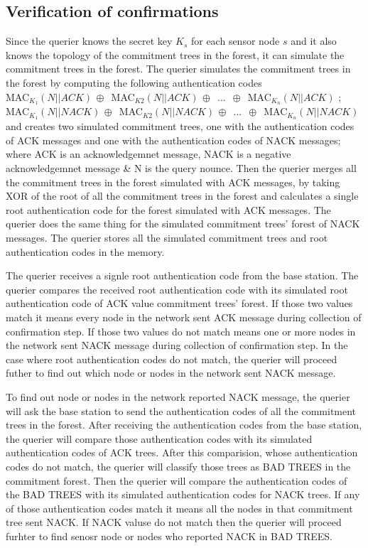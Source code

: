 \subsection{Verification of confirmations}
Since the querier knows the secret key $K_{s}$ for each sensor node $s$ and 
it also knows the topology of the commitment trees in the forest, it can simulate the commitment trees in the forest. The querier simulates the commitment trees in the forest by computing the following authentication codes\\
MAC$_{K_{1}}(N||ACK)\,\oplus\,$ 
MAC$_{K2}(N||ACK)\,\oplus\,$
...
$\,\oplus\,$
MAC$_{K_{n}}(N||ACK)$ ; \\
MAC$_{K_{1}}(N||NACK)\,\oplus\,$ 
MAC$_{K2}(N||NACK)\,\oplus\,$
...
$\,\oplus\,$
MAC$_{K_{n}}(N||NACK)$  \\
and creates two simulated commitment trees, one with the authentication codes of ACK messages and one with the authentication codes of NACK messages; where ACK is an acknowledgemnet message, NACK is a negative acknowledgemnet message \& N is the query nounce. Then the querier merges all the commitment trees in the forest simulated with ACK messages, by taking XOR of the root of all the commitment trees in the forest and calculates a single root authentication code for the forest simulated with ACK messages. The querier does the same thing for the simulated commitment trees' forest of NACK messages. The querier stores all the simulated commitment trees and root authentication codes in the memory. 

The querier receives a signle root authentication code from the base station. The querier compares the received root authentication code with its simulated root authentication code of ACK value commitment trees' forest. If those two values match it means every node in the network sent ACK message during collection of confirmation step. If those two values do not match means one or more nodes in the network sent NACK message during collection of confirmation step. In the case where root authentication codes do not match, the querier will proceed futher to find out which node or nodes in the network sent NACK message.

To find out node or nodes in the network reported NACK message, the querier will ask the base station to send the authentication codes of all the commitment trees in the forest. After receiving the authentication codes from the base station, the querier will compare those authentication codes with its simulated authentication codes of ACK trees. After this comparision, whose authentication codes do not match, the querier will classify those trees as BAD TREES in the commitment forest. Then the querier will compare the authentication codes of the BAD TREES with its simulated authentication codes for NACK trees. If any of those authentication codes match it means all the nodes in that commitment tree sent NACK. If NACK valuse do not match then the querier will proceed furhter to find senosr node or nodes who reported NACK in BAD TREES.

